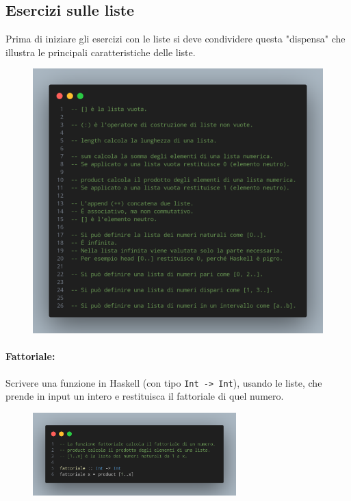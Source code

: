 \pagebreak

\subsection{Esercizi sulle liste}

Prima di iniziare gli esercizi con le liste si deve condividere questa "dispensa"
che illustra le principali caratteristiche delle liste.

\begin{figure}[!h]
    \centering
    \includegraphics[width=1\textwidth]{images/Dispensa liste.png}
\end{figure}

\pagebreak

\paragraph{Fattoriale:} Scrivere una funzione in Haskell (con tipo \texttt{Int -> Int}), usando 
le liste, che prende in input un intero e restituisca il fattoriale di quel numero.


\begin{figure}[!h]
    \centering
    \includegraphics[width=0.7\textwidth]{images/Fattoriale.png}
\end{figure}

